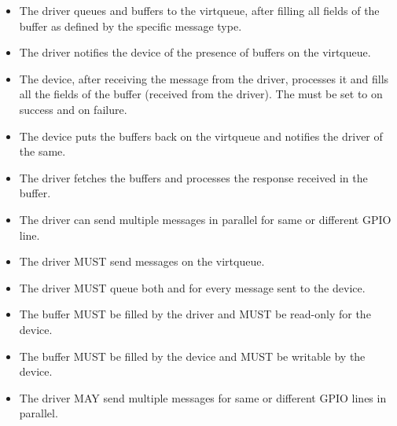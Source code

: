 \begin{itemize}
\item The driver queues  and
     buffers to the  virtqueue,
    after filling all fields of the  buffer as
    defined by the specific message type.

\item The driver notifies the device of the presence of buffers on the
     virtqueue.

\item The device, after receiving the message from the driver, processes it and
    fills all the fields of the  buffer
    (received from the driver). The  must be set to
     on success and 
    on failure.

\item The device puts the buffers back on the  virtqueue and
    notifies the driver of the same.

\item The driver fetches the buffers and processes the response received in the
     buffer.

\item The driver can send multiple messages in parallel for same or different
    GPIO line.
\end{itemize}


\begin{itemize}
\item The driver MUST send messages on the  virtqueue.

\item The driver MUST queue both  and
     for every message sent to the device.

\item The  buffer MUST be filled by the driver
    and MUST be read-only for the device.

\item The  buffer MUST be filled by the
    device and MUST be writable by the device.

\item The driver MAY send multiple messages for same or different GPIO lines in
    parallel.
\end{itemize}

